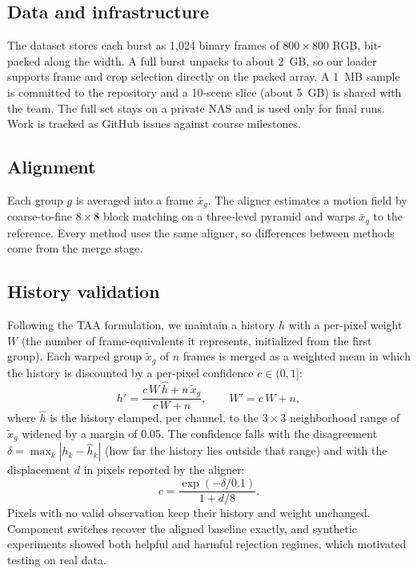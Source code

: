 \documentclass[10pt,twocolumn]{article}
\begin{document}
\subsection{Data and infrastructure}

The dataset stores each burst as 1{,}024 binary frames of $800\times800$ RGB, bit-packed along the width. A full burst unpacks to about 2~GB, so our loader supports frame and crop selection directly on the packed array. A 1~MB sample is committed to the repository and a 10-scene slice (about 5~GB) is shared with the team. The full set stays on a private NAS and is used only for final runs. Work is tracked as GitHub issues against course milestones.

\subsection{Alignment}

Each group $g$ is averaged into a frame $\bar{x}_g$. The aligner estimates a motion field by coarse-to-fine $8\times8$ block matching on a three-level pyramid and warps $\bar{x}_g$ to the reference. Every method uses the same aligner, so differences between methods come from the merge stage.

\subsection{History validation}

Following the TAA formulation, we maintain a history $h$ with a per-pixel weight $W$ (the number of frame-equivalents it represents, initialized from the first group). Each warped group $\tilde{x}_g$ of $n$ frames is merged as a weighted mean in which the history is discounted by a per-pixel confidence $c\in(0,1]$:
\begin{equation}
  h' = \frac{c\,W\,\hat{h} + n\,\tilde{x}_g}{c\,W + n}, \qquad W' = c\,W + n,
\end{equation}
where $\hat{h}$ is the history clamped, per channel, to the $3\times3$ neighborhood range of $\tilde{x}_g$ widened by a margin of 0.05. The confidence falls with the disagreement $\delta=\max_k|h_k-\hat{h}_k|$ (how far the history lies outside that range) and with the displacement $d$ in pixels reported by the aligner:
\begin{equation}
  c = \frac{\exp(-\delta/0.1)}{1 + d/8}.
\end{equation}
Pixels with no valid observation keep their history and weight unchanged. Component switches recover the aligned baseline exactly, and synthetic experiments showed both helpful and harmful rejection regimes, which motivated testing on real data.
\end{document}
